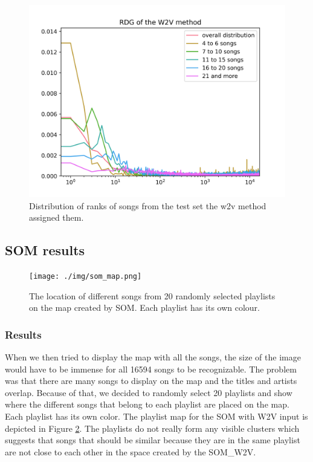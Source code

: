 \begin{figure}[h]
    \centering
	\includegraphics[width=120mm]{./img/w2v_graph.png}
	\caption{Distribution of ranks of songs from the test set the w2v method assigned them.}
	\label{fig:w2v_distribution}
\end{figure}

\subsection{SOM results}\label{ssec:som_results}

\begin{figure}[]
    \centering
	\texttt{[image: ./img/som\_map.png]}
	\caption{The location of different songs from 20 randomly selected playlists on the map created by SOM. Each playlist has its own colour.}
	\label{fig:som_map}
\end{figure}

\subsubsection{Results}
When we then tried to display the map with all the songs, the size of the image would have to be immense for all 16594 songs to be recognizable. The problem was that there are many songs to display on the map and the titles and artists overlap. Because of that, we decided to randomly select 20 playlists and show where the different songs that belong to each playlist are placed on the map. Each playlist has its own color. The playlist map for the SOM with W2V input is depicted in Figure \ref{fig:som_map}. The playlists do not really form any visible clusters which suggests that songs that should be similar because they are in the same playlist are not close to each other in the space created by the SOM\_W2V. 

